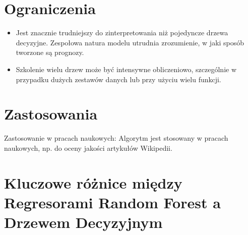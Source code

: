 {}
\section*{Ograniczenia }
\vspace{-1.0em}

\begin{itemize}

\item Jest znacznie trudniejszy do zinterpretowania niż pojedyncze drzewa decyzyjne. Zespołowa natura modelu utrudnia zrozumienie, w jaki sposób tworzone są prognozy. 

\item Szkolenie wielu drzew może być intensywne obliczeniowo, szczególnie w przypadku dużych zestawów danych lub przy użyciu wielu funkcji.
\end{itemize}

{}
\section*{Zastosowania \cite{lewoniewski2016quality, wecel2015modelling}}
\vspace{-1.0em}

Zastosowanie w pracach naukowych: Algorytm jest stosowany w pracach naukowych, np. do oceny jakości artykułów Wikipedii.

{}
\section*{Kluczowe różnice między Regresorami Random Forest a Drzewem Decyzyjnym}
\vspace{-1.0em}

